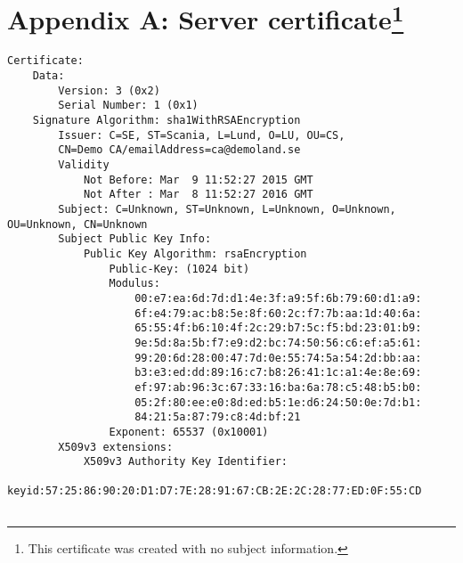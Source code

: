 \documentclass[11pt,a4paper]{article}
\begin{document}
\section[Appendix A: Server certificate]{Appendix A: Server certificate\footnote{This certificate was created with no subject information.}}
\begin{verbatim}
Certificate:
    Data:
        Version: 3 (0x2)
        Serial Number: 1 (0x1)
    Signature Algorithm: sha1WithRSAEncryption
        Issuer: C=SE, ST=Scania, L=Lund, O=LU, OU=CS,
        CN=Demo CA/emailAddress=ca@demoland.se
        Validity
            Not Before: Mar  9 11:52:27 2015 GMT
            Not After : Mar  8 11:52:27 2016 GMT
        Subject: C=Unknown, ST=Unknown, L=Unknown, O=Unknown, OU=Unknown, CN=Unknown
        Subject Public Key Info:
            Public Key Algorithm: rsaEncryption
                Public-Key: (1024 bit)
                Modulus:
                    00:e7:ea:6d:7d:d1:4e:3f:a9:5f:6b:79:60:d1:a9:
                    6f:e4:79:ac:b8:5e:8f:60:2c:f7:7b:aa:1d:40:6a:
                    65:55:4f:b6:10:4f:2c:29:b7:5c:f5:bd:23:01:b9:
                    9e:5d:8a:5b:f7:e9:d2:bc:74:50:56:c6:ef:a5:61:
                    99:20:6d:28:00:47:7d:0e:55:74:5a:54:2d:bb:aa:
                    b3:e3:ed:dd:89:16:c7:b8:26:41:1c:a1:4e:8e:69:
                    ef:97:ab:96:3c:67:33:16:ba:6a:78:c5:48:b5:b0:
                    05:2f:80:ee:e0:8d:ed:b5:1e:d6:24:50:0e:7d:b1:
                    84:21:5a:87:79:c8:4d:bf:21
                Exponent: 65537 (0x10001)
        X509v3 extensions:
            X509v3 Authority Key Identifier: 
                keyid:57:25:86:90:20:D1:D7:7E:28:91:67:CB:2E:2C:28:77:ED:0F:55:CD


\end{verbatim}
\end{document}
